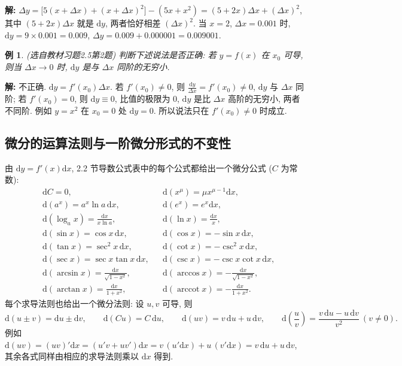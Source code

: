 \documentclass[UTF8,openany]{ctexbook}
\theoremstyle{chinesetextbook}
\newtheorem{example}{例}[section]
\newenvironment{cnsolution}{\par\indent\textbf{解:} \ignorespaces}{\par}
\newcommand{\dd}{\mathrm d}
\begin{document}
\begin{cnsolution}
$\Delta y=\bigl[5(x+\Delta x)+(x+\Delta x)^2\bigr]-(5x+x^2)=(5+2x)\Delta x+(\Delta x)^2$, 其中 $(5+2x)\Delta x$ 就是 $\dd y$, 两者恰好相差 $(\Delta x)^2$. 当 $x=2$, $\Delta x=0.001$ 时, $\dd y=9\times0.001=0.009$, $\Delta y=0.009+0.000001=0.009001$.
\end{cnsolution}
\begin{example}\label{ex:c2-h5-2}
\textnormal{(选自教材习题2.5第2题)} 判断下述说法是否正确: 若 $y=f(x)$ 在 $x_0$ 可导, 则当 $\Delta x\to0$ 时, $\dd y$ 是与 $\Delta x$ 同阶的无穷小.
\end{example}
\begin{cnsolution}
不正确. $\dd y=f'(x_0)\Delta x$. 若 $f'(x_0)\ne0$, 则 $\displaystyle\frac{\dd y}{\Delta x}=f'(x_0)\ne0$, $\dd y$ 与 $\Delta x$ 同阶; 若 $f'(x_0)=0$, 则 $\dd y\equiv0$, 比值的极限为 $0$, $\dd y$ 是比 $\Delta x$ 高阶的无穷小, 两者不同阶. 例如 $y=x^2$ 在 $x_0=0$ 处 $\dd y=0$. 所以说法只在 $f'(x_0)\ne0$ 时成立.
\end{cnsolution}
\subsection{微分的运算法则与一阶微分形式的不变性}
由 $\dd y=f'(x)\dd x$, 2.2 节导数公式表中的每个公式都给出一个微分公式 ($C$ 为常数):
\[
\begin{aligned}
&\dd C=0, &&\dd(x^\mu)=\mu x^{\mu-1}\dd x,\\
&\dd(a^x)=a^x\ln a\,\dd x, &&\dd(e^x)=e^x\dd x,\\
&\dd(\log_ax)=\frac{\dd x}{x\ln a}, &&\dd(\ln x)=\frac{\dd x}x,\\
&\dd(\sin x)=\cos x\,\dd x, &&\dd(\cos x)=-\sin x\,\dd x,\\
&\dd(\tan x)=\sec^2x\,\dd x, &&\dd(\cot x)=-\csc^2x\,\dd x,\\
&\dd(\sec x)=\sec x\tan x\,\dd x, &&\dd(\csc x)=-\csc x\cot x\,\dd x,\\
&\dd(\arcsin x)=\frac{\dd x}{\sqrt{1-x^2}}, &&\dd(\arccos x)=-\frac{\dd x}{\sqrt{1-x^2}},\\
&\dd(\arctan x)=\frac{\dd x}{1+x^2},\qquad &&\dd(\operatorname{arccot}x)=-\frac{\dd x}{1+x^2}.
\end{aligned}
\]
每个求导法则也给出一个微分法则: 设 $u,v$ 可导, 则
\[
\dd(u\pm v)=\dd u\pm\dd v,\qquad\dd(Cu)=C\,\dd u,\qquad\dd(uv)=v\,\dd u+u\,\dd v,\qquad\dd\left(\frac uv\right)=\frac{v\,\dd u-u\,\dd v}{v^2}\ (v\ne0).
\]
例如 $\dd(uv)=(uv)'\dd x=(u'v+uv')\dd x=v\,(u'\dd x)+u\,(v'\dd x)=v\,\dd u+u\,\dd v$, 其余各式同样由相应的求导法则乘以 $\dd x$ 得到.
\end{document}
